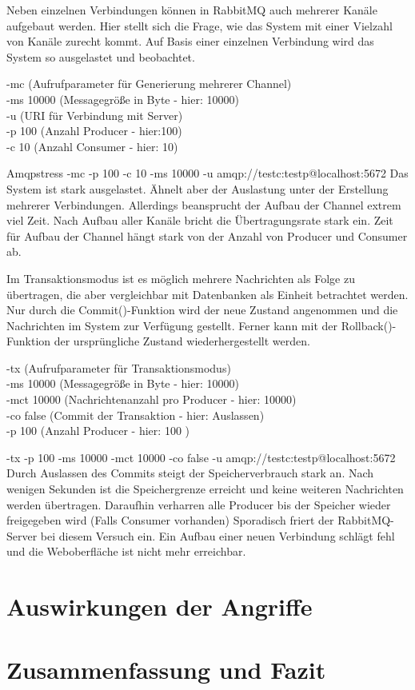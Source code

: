 \documentclass[	a4paper,
			11pt,
			titlepage,
			oneside,
			fleqn,
			listof=totoc,
			parskip,
			chapterprefix=false,
			numbers=noenddot]{scrreprt}
\begin{document}
		
		{Neben einzelnen Verbindungen können in RabbitMQ auch mehrerer Kanäle aufgebaut werden. Hier stellt sich die Frage, wie das System mit einer Vielzahl von Kanäle zurecht kommt. Auf Basis einer einzelnen Verbindung wird das System so ausgelastet und beobachtet. }%
		{\parbox[c][2cm][c]{10.5cm}{-mc (Aufrufparameter für Generierung mehrerer Channel) \\ -ms 10000 (Messagegröße in Byte - hier: 10000) \\ -u (URI für Verbindung mit Server) \\ -p 100 (Anzahl Producer - hier:100) \\ -c 10 (Anzahl Consumer - hier: 10)}}%
		{Amqpstress -mc -p 100 -c 10 -ms 10000 -u amqp://testc:testp@localhost:5672}%
		{Das System ist stark ausgelastet. Ähnelt aber der Auslastung unter der Erstellung mehrerer Verbindungen. Allerdings beansprucht  der Aufbau der Channel extrem viel Zeit. Nach Aufbau aller Kanäle bricht die Übertragungsrate stark ein.}
		{Zeit für Aufbau der Channel hängt stark von der Anzahl von Producer und Consumer ab.}

		
		{Im Transaktionsmodus ist es möglich mehrere Nachrichten als Folge zu übertragen, die aber vergleichbar mit Datenbanken als Einheit betrachtet werden. Nur durch die Commit()-Funktion wird der neue Zustand angenommen und die Nachrichten im System zur Verfügung gestellt. Ferner kann mit der Rollback()-Funktion der ursprüngliche Zustand wiederhergestellt werden.}%
		{\parbox[c][2.3cm][c]{10.5cm}{-tx (Aufrufparameter für Transaktionsmodus) \\ -ms 10000 (Messagegröße in Byte - hier: 10000) \\ -mct 10000 (Nachrichtenanzahl pro Producer - hier: 10000) \\ -co false (Commit der Transaktion - hier: Auslassen)\\ -p 100 (Anzahl Producer - hier: 100 )}}%
		{-tx -p 100 -ms 10000 -mct 10000 -co false -u amqp://testc:testp@localhost:5672}%
		{Durch Auslassen des Commits steigt der Speicherverbrauch stark an. Nach wenigen Sekunden ist die Speichergrenze erreicht und keine weiteren Nachrichten werden übertragen. Daraufhin verharren alle Producer bis der Speicher wieder freigegeben wird (Falls Consumer vorhanden) }
		{Sporadisch friert der RabbitMQ-Server bei diesem Versuch ein. Ein Aufbau einer neuen Verbindung schlägt fehl und die Weboberfläche ist nicht mehr erreichbar. }
	
	
	\clearpage
	\section*{Auswirkungen der Angriffe}
	
	
	
	\clearpage
	\section*{Zusammenfassung und Fazit}
\end{document}
